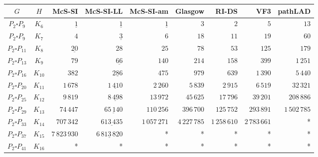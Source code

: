 
\begin{tabular}{ccrrrrrrr}
    \toprule
    {$G$} & {$H$} & {McS-SI} & {McS-SI-LL} & {McS-SI-am} & Glasgow & RI-DS & VF3 & pathLAD \\ 
    \midrule

$P_2\square P_{9}$ & $K_{6}$ & $\underline{1}$ & $\underline{1}$ & $\underline{1}$ & $3$ & $2$ & $5$ & $13$\\
$P_2\square P_{9}$ & $K_{7}$ & $4$ & $\underline{3}$ & $6$ & $18$ & $11$ & $19$ & $60$\\
$P_2\square P_{11}$ & $K_{8}$ & $\underline{20}$ & $28$ & $25$ & $78$ & $53$ & $125$ & $179$\\
$P_2\square P_{13}$ & $K_{9}$ & $79$ & $\underline{66}$ & $140$ & $214$ & $158$ & $399$ & $1\,251$\\
$P_2\square P_{16}$ & $K_{10}$ & $382$ & $\underline{286}$ & $475$ & $979$ & $639$ & $1\,390$ & $5\,440$\\
$P_2\square P_{20}$ & $K_{11}$ & $1\,678$ & $\underline{1\,410}$ & $2\,260$ & $5\,839$ & $2\,915$ & $6\,519$ & $32\,321$\\
$P_2\square P_{25}$ & $K_{12}$ & $9\,819$ & $\underline{8\,498}$ & $13\,972$ & $45\,625$ & $17\,796$ & $39\,201$ & $208\,886$\\
$P_2\square P_{29}$ & $K_{13}$ & $74\,447$ & $\underline{65\,140}$ & $110\,256$ & $396\,700$ & $125\,752$ & $293\,891$ & $1\,502\,785$\\
$P_2\square P_{33}$ & $K_{14}$ & $707\,342$ & $\underline{613\,435}$ & $1\,057\,271$ & $4\,227\,785$ & $1\,258\,610$ & $2\,783\,661$ & *\\
$P_2\square P_{37}$ & $K_{15}$ & $7\,823\,930$ & $\underline{6\,813\,820}$ & * & * & * & * & *\\
$P_2\square P_{41}$ & $K_{16}$ & * & * & * & * & * & * & *\\

    \bottomrule
\end{tabular}

